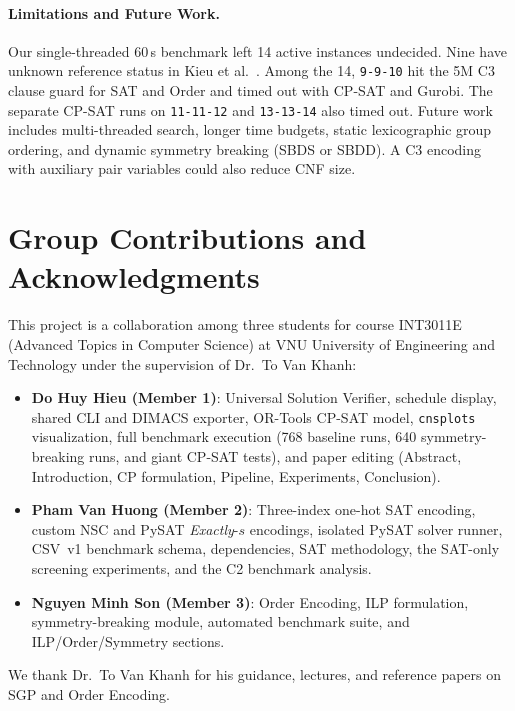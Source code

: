 \documentclass[a4paper,fleqn]{cas-sc}
\begin{document}
\paragraph{Limitations and Future Work.}
Our single-threaded 60\,s benchmark left 14 active instances undecided.
Nine have unknown reference status in Kieu et al.~\cite{kieu2025nse}.
Among the 14, \texttt{9-9-10} hit the 5M C3 clause guard for SAT and Order
and timed out with CP-SAT and Gurobi. The separate CP-SAT runs on
\texttt{11-11-12} and \texttt{13-13-14} also timed out. Future work includes
multi-threaded search, longer time budgets, static lexicographic group ordering,
and dynamic symmetry breaking (SBDS or SBDD). A C3 encoding with auxiliary
pair variables could also reduce CNF size.

\section*{Group Contributions and Acknowledgments}
This project is a collaboration among three students for course INT3011E (Advanced Topics in Computer Science) at VNU University of Engineering and Technology under the supervision of Dr.~To Van Khanh:
\begin{itemize}[noitemsep]
    \item \textbf{Do Huy Hieu (Member 1)}: Universal Solution Verifier, schedule display, shared CLI and DIMACS exporter, OR-Tools CP-SAT model, \texttt{cnsplots} visualization, full benchmark execution (768 baseline runs, 640 symmetry-breaking runs, and giant CP-SAT tests), and paper editing (Abstract, Introduction, CP formulation, Pipeline, Experiments, Conclusion).
    \item \textbf{Pham Van Huong (Member 2)}: Three-index one-hot SAT encoding, custom NSC and PySAT \textit{Exactly}-$s$ encodings, isolated PySAT solver runner, CSV~v1 benchmark schema, dependencies, SAT methodology, the SAT-only screening experiments, and the C2 benchmark analysis.
    \item \textbf{Nguyen Minh Son (Member 3)}: Order Encoding, ILP formulation, symmetry-breaking module, automated benchmark suite, and ILP/Order/Symmetry sections.
\end{itemize}
We thank Dr.~To Van Khanh for his guidance, lectures, and reference papers on SGP and Order Encoding.
\end{document}
